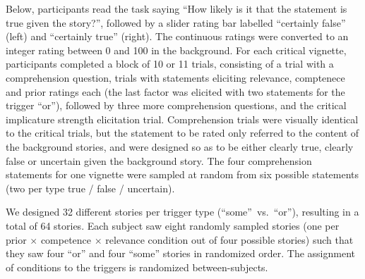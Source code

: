 \documentclass{sp}
\begin{document}
Below, participants read the task saying ``How likely is it that the statement is true given the story?'', followed by a slider rating bar labelled ``certainly false'' (left) and ``certainly true'' (right). The continuous ratings were converted to an integer rating between 0 and 100 in the background. For each critical vignette, participants completed a block of 10 or 11 trials, consisting of a trial with a comprehension question, trials with statements eliciting relevance, comptenece and prior ratings each (the last factor was elicited with two statements for the trigger ``or''), followed by three more comprehension questions, and the critical implicature strength elicitation trial. 
Comprehension trials were visually identical to the critical trials, but the statement to be rated only referred to the content of the background stories, and were designed so as to be either clearly true, clearly false or uncertain given the background story. 
The four comprehension statements for one vignette were sampled at random from six possible statements (two per type true / false / uncertain). 
 
 We designed 32 different stories per trigger type (``some''~vs.~``or''), resulting in a total of 64 stories. Each subject saw eight randomly sampled stories (one per prior $\times$ competence $\times$ relevance condition out of four possible stories) such that they saw four ``or'' and four ``some'' stories in randomized order. The assignment of conditions to the triggers is randomized between-subjects.
\end{document}
